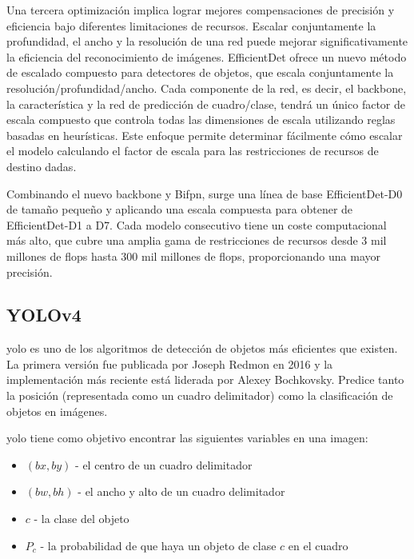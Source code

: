 Una tercera optimización implica lograr mejores compensaciones de precisión y eficiencia bajo diferentes limitaciones de recursos. Escalar conjuntamente la profundidad, el ancho y la resolución de una red puede mejorar significativamente la eficiencia del reconocimiento de imágenes. EfficientDet ofrece un nuevo método de escalado compuesto para detectores de objetos, que escala conjuntamente la resolución/profundidad/ancho. Cada componente de la red, es decir, el backbone, la característica y la red de predicción de cuadro/clase, tendrá un único factor de escala compuesto que controla todas las dimensiones de escala utilizando reglas basadas en heurísticas. Este enfoque permite determinar fácilmente cómo escalar el modelo calculando el factor de escala para las restricciones de recursos de destino dadas.

Combinando el nuevo backbone y Bi\gls{fpn}, surge una línea de base EfficientDet-D0 de tamaño pequeño y aplicando una escala compuesta para obtener de EfficientDet-D1 a D7. Cada modelo consecutivo tiene un coste computacional más alto, que cubre una amplia gama de restricciones de recursos desde 3 mil millones de \gls{flops} hasta 300 mil millones de \gls{flops}, proporcionando una mayor precisión.

\subsection{YOLOv4}
\label{subsec:yolov4}

\gls{yolo} \cite{bochkovskiy2020yolov4} es uno de los algoritmos de detección de objetos más eficientes que existen. La primera versión fue publicada por Joseph Redmon \cite{redmon2016look} en 2016 y la implementación más reciente \cite{bochkovskiy2020yolov4} está liderada por Alexey Bochkovsky. Predice tanto la posición (representada como un cuadro delimitador) como la clasificación de objetos en imágenes.

\gls{yolo} tiene como objetivo encontrar las siguientes variables en una imagen:

\begin{itemize}
    \item $(bx, by)$ - el centro de un cuadro delimitador
    \item $(bw, bh)$ - el ancho y alto de un cuadro delimitador
    \item $c$ - la clase del objeto
    \item $P_c$ - la probabilidad de que haya un objeto de clase $c$ en el cuadro
\end{itemize}

